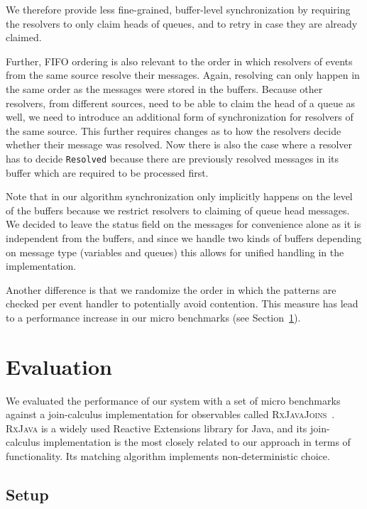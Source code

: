 \documentclass[runningheads]{llncs}
\begin{document}
\begin{sloppypar}
We therefore provide less fine-grained, buffer-level synchronization by
requiring the resolvers to only claim heads of queues, and to retry in case
they are already claimed.

Further, FIFO ordering is also relevant to the order in which resolvers of
events from the same source resolve their messages. Again, resolving can only
happen in the same order as the messages were stored in the buffers. Because
other resolvers, from different sources, need to be able to claim the head of
a queue as well, we need to introduce an additional form of synchronization
for resolvers of the same source. This further requires changes as to how the
resolvers decide whether their message was resolved. Now there is also the
case where a resolver has to decide \texttt{Resolved} because there are
previously resolved messages in its buffer which are required to be processed
first.

Note that in our algorithm synchronization only implicitly happens on the
level of the buffers because we restrict resolvers to claiming of queue head
messages. We decided to leave the status field on the messages for convenience
alone as it is independent from the buffers, and since we handle two kinds of
buffers depending on message type (variables and queues) this allows for
unified handling in the implementation.

Another difference is that we randomize the order in which the patterns are
checked per event handler to potentially avoid contention. This measure has
lead to a performance increase in our micro benchmarks (see
Section~\ref{sec:evaluation}).


\section{Evaluation}\label{sec:evaluation}

We evaluated the performance of our system with a set of micro benchmarks
against a join-calculus implementation for observables called
\textsc{RxJavaJoins}~\cite{RxJavaJoins}. \textsc{RxJava} is a widely used
Reactive Extensions library for Java, and its join-calculus implementation is
the most closely related to our approach in terms of functionality. Its
matching algorithm implements non-deterministic choice.

\subsection{Setup}


\end{sloppypar}
\end{document}
